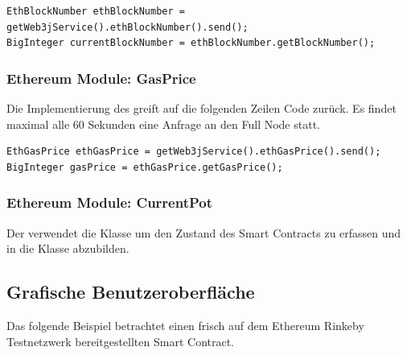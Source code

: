 \begin{lstlisting}[basicstyle=\small]
EthBlockNumber ethBlockNumber = getWeb3jService().ethBlockNumber().send();
BigInteger currentBlockNumber = ethBlockNumber.getBlockNumber();
\end{lstlisting}

\subsubsection{Ethereum Module: GasPrice}

Die Implementierung des  greift auf die folgenden Zeilen Code zurück. Es findet maximal alle 60 Sekunden eine Anfrage an den Full Node statt.

\begin{lstlisting}[basicstyle=\small]
EthGasPrice ethGasPrice = getWeb3jService().ethGasPrice().send();
BigInteger gasPrice = ethGasPrice.getGasPrice();
\end{lstlisting}


\subsubsection{Ethereum Module: CurrentPot}

Der  verwendet die Klasse  um den Zustand des Smart Contracts zu erfassen und in die Klasse  abzubilden.

\subsection{Grafische Benutzeroberfläche}

Das folgende Beispiel betrachtet einen frisch auf dem Ethereum Rinkeby Testnetzwerk bereitgestellten Smart Contract.


